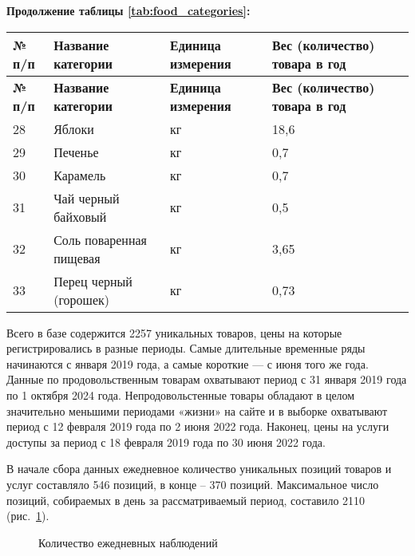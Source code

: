 \newpage %

\noindent
\textbf{Продолжение таблицы \ref{tab:food_categories}:} \\

\begin{longtable}{p{0.5cm} p{3.5cm} p{3.5cm} p{3cm}} %
	\toprule
	\textbf{№ п/п} & \textbf{Название категории} & \textbf{Единица измерения} & \textbf{Вес (количество) товара в год} \\
	\midrule
	\endfirsthead
	
	\toprule
	\textbf{№ п/п} & \textbf{Название категории} & \textbf{Единица измерения} & \textbf{Вес (количество) товара в год} \\
	\midrule
	\endhead
	
	\endfoot
	
	\endlastfoot
	
	\footnotesize %
	28  & Яблоки & кг & 18,6 \\
	29  & Печенье & кг & 0,7 \\
	30  & Карамель & кг & 0,7 \\
	31  & Чай черный байховый & кг & 0,5 \\
	32  & Соль поваренная пищевая & кг & 3,65 \\
	33  & Перец черный (горошек) & кг & 0,73 \\
	
\end{longtable}

Всего в базе содержится 2257 уникальных товаров, цены на которые регистрировались в разные периоды. Самые длительные временные ряды начинаются с января 2019 года, а самые короткие — с июня того же года. Данные по продовольственным товарам охватывают период с 31 января 2019 года по 1 октября 2024 года. Непродовольстенные товары обладают в целом значительно меньшими периодами «жизни» на сайте и в выборке охватывают период с 12 февраля 2019 года по 2 июня 2022 года. Наконец, цены на услуги доступы за период с 18 февраля 2019 года по 30 июня 2022 года.

В начале сбора данных ежедневное количество уникальных позиций товаров и услуг составляло 546 позиций, в конце – 370 позиций. Максимальное число позиций, собираемых в день за рассматриваемый период, составило 2110 (рис.~\cref{fig:count_obs}).

\begin{figure}[ht]
	\caption{Количество ежедневных наблюдений}\label{fig:count_obs}
\end{figure}

